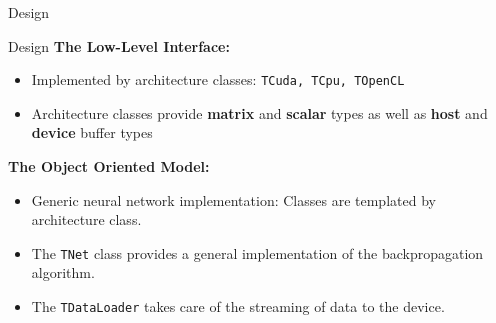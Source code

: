 \documentclass{beamer}
\begin{document}
\begin{frame}{Design}

\end{frame}

\begin{frame}{Design}
  \textbf{The Low-Level Interface:}
  \begin{itemize}
    \item Implemented by architecture classes: \texttt{TCuda, TCpu, TOpenCL}
    \item Architecture classes provide \textbf{matrix} and \textbf{scalar} types
      as well as \textbf{host} and \textbf{device} buffer types
  \end{itemize}
  \textbf{The Object Oriented Model:}
 \begin{itemize}
    \item Generic neural network implementation: Classes are templated
     by architecture class.
    \item The \texttt{TNet} class provides a general implementation of the
      backpropagation algorithm.
    \item The \texttt{TDataLoader} takes care of the streaming of data to
      the device.
 \end{itemize}
\end{frame}
\end{document}
